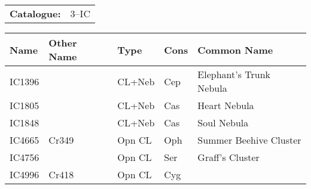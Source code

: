 \begin{tabular}{ p{0.9in} p{1.3in}}
{\bf Catalogue:} & 3--IC \\ 
\end{tabular}
\begin{longtable}{ p{0.7in}  p{1.0in}  p{0.6in}  p{0.9in}  p{5.1in} }
\hline 
{\bf Name} & {\bf Other Name} & {\bf Type} & {\bf Cons} & {\bf Common Name} \\ 
\hline 
IC1396 &  & CL+Neb & Cep & Elephant's Trunk Nebula \\ 
IC1805 &  & CL+Neb & Cas & Heart Nebula \\ 
IC1848 &  & CL+Neb & Cas & Soul Nebula \\ 
IC4665 & Cr349 & Opn CL & Oph & Summer Beehive Cluster \\ 
IC4756 &  & Opn CL & Ser & Graff's Cluster \\ 
IC4996 & Cr418 & Opn CL & Cyg &  \\ 
\hline 
\end{longtable} 
